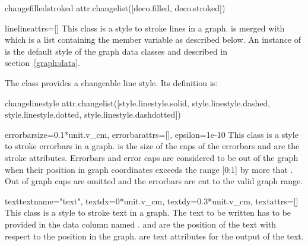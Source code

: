 \begin{memberdesc}{changefilledstroked}
  attr.changelist([deco.filled, deco.stroked])
\end{memberdesc} %

\begin{classdesc}{line}{lineattrs=[]} %
  This class is a style to stroke lines in a graph.
   is merged with  which is
  a list containing the member variable  as
  described below. An instance of  is the default style
  of the graph data classes  and 
  described in section~\ref{graph:data}.
\end{classdesc}

The class  provides a changeable line style. Its
definition is:

\begin{memberdesc}{changelinestyle}
  attr.changelist([style.linestyle.solid, style.linestyle.dashed, style.linestyle.dotted, style.linestyle.dashdotted])
\end{memberdesc} %

\begin{classdesc}{errorbar}{size=0.1*unit.v\_cm, errorbarattrs=[], %
                            epsilon=1e-10}
  This class is a style to stroke errorbars in a graph.  is
  the size of the caps of the errorbars and  are
  the stroke attributes. Errorbars and error caps are considered to be
  out of the graph when their position in graph coordinates exceeds
  the range [0:1] by more that . Out of graph caps are
  omitted and the errorbars are cut to the valid graph range.
\end{classdesc} %

\begin{classdesc}{text}{textname="text", %
                        textdx=0*unit.v\_cm, textdy=0.3*unit.v\_cm,
                        textattrs=[]}
  This class is a style to stroke text in a graph. The
  text to be written has to be provided in the data column named
  .  and  are the position of the
  text with respect to the position in the graph.  are text
  attributes for the output of the text.
\end{classdesc} %

